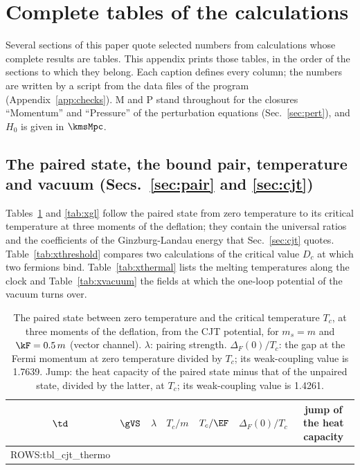 \section{Complete tables of the calculations}
\label{app:tables}

Several sections of this paper quote selected numbers from calculations whose complete results
are tables. This appendix prints those tables, in the order of the sections to which they belong.
Each caption defines every column; the numbers are written by a script from the data files of the
program (Appendix~\ref{app:checks}). M and P stand throughout for the closures ``Momentum'' and
``Pressure'' of the perturbation equations (Sec.~\ref{sec:pert}), and $H_0$ is given in $\kmsMpc$.

\subsection{The paired state, the bound pair, temperature and vacuum (Secs.~\ref{sec:pair} and \ref{sec:cjt})}

Tables~\ref{tab:xthermo} and \ref{tab:xgl} follow the paired state from zero temperature to its
critical temperature at three moments of the deflation; they contain the universal ratios and the
coefficients of the Ginzburg-Landau energy that Sec.~\ref{sec:cjt} quotes.
Table~\ref{tab:xthreshold} compares two calculations of the critical value $D_c$ at which two
fermions bind. Table~\ref{tab:xthermal} lists the melting temperatures along the clock and
Table~\ref{tab:xvacuum} the fields at which the one-loop potential of the vacuum turns over.

\begin{table}
\caption{\label{tab:xthermo}The paired state between zero temperature and the critical temperature
$T_c$, at three moments of the deflation, from the CJT potential, for $m_s=m$ and $\kF=0.5\,m$
(vector channel). $\lambda$: pairing strength. $\Delta_F(0)/T_c$: the gap at the Fermi momentum at zero
temperature divided by $T_c$; its weak-coupling value is 1.7639. Jump: the heat capacity of the paired
state minus that of the unpaired state, divided by the latter, at $T_c$; its weak-coupling value is
1.4261.}
\begin{ruledtabular}
\begin{tabular}{ccccccc}
$\td$ & $\gVS$ & $\lambda$ & $T_c/m$ & $T_c/\EF$ & $\Delta_F(0)/T_c$ & jump of the heat capacity \\
\hline
{{ROWS:tbl_cjt_thermo}}
\end{tabular}
\end{ruledtabular}
\end{table}

